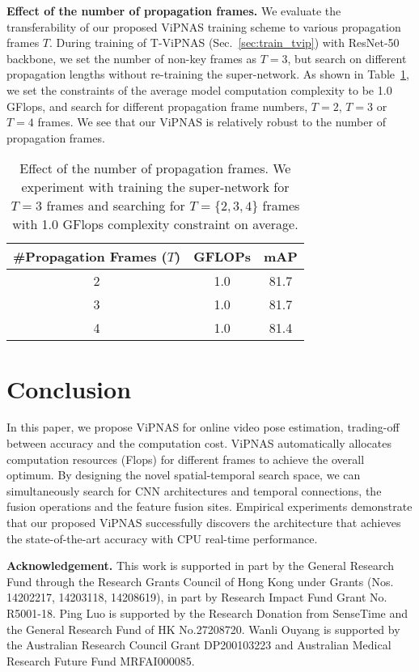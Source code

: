 \documentclass[final]{cvpr}
\begin{document}
\textbf{Effect of the number of propagation frames.} We evaluate the transferability of our proposed ViPNAS training scheme to various propagation frames $T$. During training of T-ViPNAS (Sec.~\ref{sec:train_tvip}) with ResNet-50 backbone, we set the number of non-key frames as $T=3$, but search on different propagation lengths without re-training the super-network. As shown in Table~\ref{tab:propagation_number}, we set the constraints of the average model computation complexity to be 1.0 GFlops, and search for different propagation frame numbers, \ie $T=2$, $T=3$ or $T=4$ frames. We see that our ViPNAS is relatively robust to the number of propagation frames.



\begin{table}[tb]
	\begin{center}
	\caption{Effect of the number of propagation frames. We experiment with training the super-network for $T=3$ frames and searching for $T=\{2,3,4\}$ frames with 1.0 GFlops complexity constraint on average.}
		\begin{tabular}{c|c|c}
			\hline
			\#Propagation Frames ($T$) & GFLOPs & mAP   \\\hline
			2  & 1.0 & 81.7 \\ 
			3  & 1.0 & 81.7 \\ 
			4  & 1.0 & 81.4 \\ \hline
		\end{tabular}
	\label{tab:propagation_number}
	\end{center}
	\vspace{-20pt}
\end{table}


\section{Conclusion}

In this paper, we propose ViPNAS for online video pose estimation, trading-off between accuracy and the computation cost. ViPNAS automatically allocates computation resources (\ie Flops) for different frames to achieve the overall optimum. By designing the novel spatial-temporal search space, we can simultaneously search for CNN architectures and temporal connections, \ie the fusion operations and the feature fusion sites. Empirical experiments demonstrate that our proposed ViPNAS successfully discovers the architecture that achieves the state-of-the-art accuracy with CPU real-time performance.


\textbf{Acknowledgement.} This work is supported in part by the General Research Fund through the Research Grants Council of Hong Kong under Grants (Nos. 14202217, 14203118, 14208619), in part by Research Impact Fund Grant No. R5001-18. Ping Luo is supported by the Research Donation from SenseTime and the General Research Fund of HK No.27208720. Wanli Ouyang is supported by the Australian Research Council Grant DP200103223 and Australian Medical Research Future Fund MRFAI000085.
\end{document}
